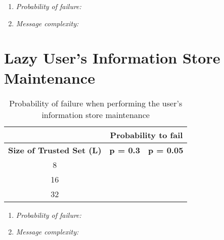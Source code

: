   \begin{enumerate}
    \item{\textit{Probability of failure:}}
    \item{\textit{Message complexity:}}
  \end{enumerate}

\section{Lazy User's Information Store Maintenance}
\label{sec:eval_lazy_maintenance}
  \begin{table}
    \centering
    \footnotesize
    \begin{tabular}{|c|c|c|}
      \cline{2-3}
      \multicolumn{1}{c|}{}&  \multicolumn{2}{c|}{\textbf{Probability to fail}} \\ \cline{2-3}
      \hline
      \textbf{Size of Trusted Set (L)} & \textbf{p = 0.3} & \textbf{p = 0.05} \\
      \hline \hline
      8 &  &  \\
      \hline
      16 &  &  \\
      \hline
      32 &  &  \\
      \hline
    \end{tabular}
    \caption{Probability of failure when performing the user's information store maintenance}
    \label{tab:p_lazy_maintenance}
  \end{table}
  
  \begin{enumerate}
    \item{\textit{Probability of failure:}}
    \item{\textit{Message complexity:}}
  \end{enumerate}

